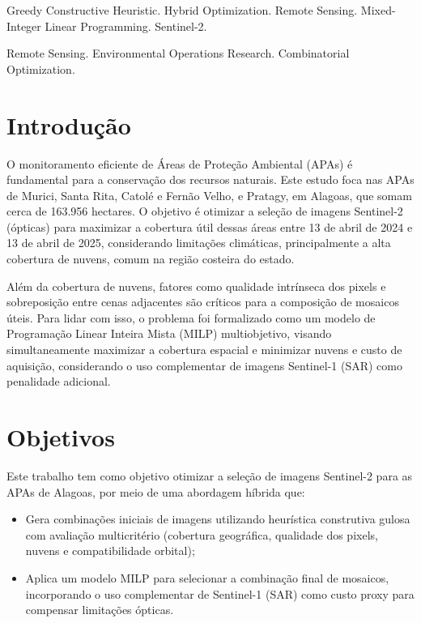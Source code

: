 \documentclass[a4paper,11pt]{article}
\begin{document}
\bigskip
\begin{keywords}
Greedy Constructive Heuristic. Hybrid Optimization. Remote Sensing. Mixed-Integer Linear Programming. Sentinel-2.

\bigskip
Remote Sensing. Environmental Operations Research. Combinatorial Optimization.
\end{keywords}

\newpage

\section{Introdução}
O monitoramento eficiente de Áreas de Proteção Ambiental (APAs) é fundamental para a conservação dos recursos naturais. Este estudo foca nas APAs de Murici, Santa Rita, Catolé e Fernão Velho, e Pratagy, em Alagoas, que somam cerca de 163.956 hectares. O objetivo é otimizar a seleção de imagens Sentinel-2 (ópticas) para maximizar a cobertura útil dessas áreas entre 13 de abril de 2024 e 13 de abril de 2025, considerando limitações climáticas, principalmente a alta cobertura de nuvens, comum na região costeira do estado.

Além da cobertura de nuvens, fatores como qualidade intrínseca dos pixels e sobreposição entre cenas adjacentes são críticos para a composição de mosaicos úteis. Para lidar com isso, o problema foi formalizado como um modelo de Programação Linear Inteira Mista (MILP) multiobjetivo, visando simultaneamente maximizar a cobertura espacial e minimizar nuvens e custo de aquisição, considerando o uso complementar de imagens Sentinel-1 (SAR) como penalidade adicional.

\section{Objetivos}
Este trabalho tem como objetivo otimizar a seleção de imagens Sentinel-2 para as APAs de Alagoas, por meio de uma abordagem híbrida que:

\begin{itemize} \item Gera combinações iniciais de imagens utilizando heurística construtiva gulosa com avaliação multicritério (cobertura geográfica, qualidade dos pixels, nuvens e compatibilidade orbital); \item Aplica um modelo MILP para selecionar a combinação final de mosaicos, incorporando o uso complementar de Sentinel-1 (SAR) como custo proxy para compensar limitações ópticas. \end{itemize}
\end{document}
